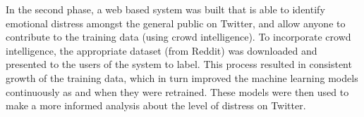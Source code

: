 In the second phase, a web based system was built that is able to identify emotional distress amongst the general public on Twitter, and allow anyone to contribute to the training data (using crowd intelligence). To incorporate crowd intelligence, the appropriate dataset (from Reddit) was downloaded and presented to the users of the system to label. This process resulted in consistent growth of the training data, which in turn improved the machine learning models continuously as and when they were retrained. These models were then used to make a more informed analysis about the level of distress on Twitter.
